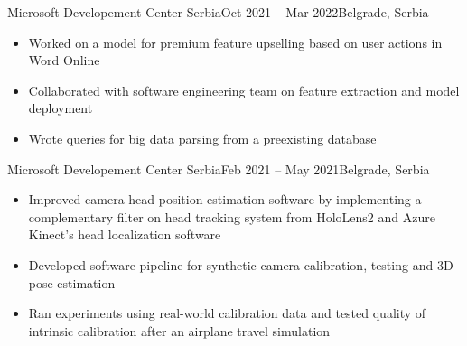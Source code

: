 \documentclass[10pt,a4paper]{source/altacv}
\begin{document}
\tagline{}

%

\begin{fullwidth}
\makecvheader 
\end{fullwidth}

%



 {Microsoft Developement Center Serbia}{Oct 2021 -- Mar 2022}{Belgrade, Serbia}

\begin{itemize}
    \item   \small{Worked on a model for premium feature upselling based on user actions in Word Online}
    \item   \small{Collaborated with software engineering team on feature extraction and model deployment}
    \item \small{Wrote queries for big data parsing from a preexisting database}
    \\
    \smallskip
    \smallskip
       

\end{itemize}

\divider

 {Microsoft Developement Center Serbia}{Feb 2021 -- May 2021}{Belgrade, Serbia}

\begin{itemize}
    \item   \small{Improved camera head position estimation software by implementing a complementary filter on head tracking system from HoloLens2 and Azure Kinect's head localization software}
    \item   \small{Developed software pipeline for synthetic camera calibration, testing and 3D pose estimation}
    \item \small{Ran experiments using real-world calibration data and tested quality of intrinsic calibration after an airplane travel simulation}
    \\
    \smallskip
    \smallskip
      

\end{itemize}
\end{document}
